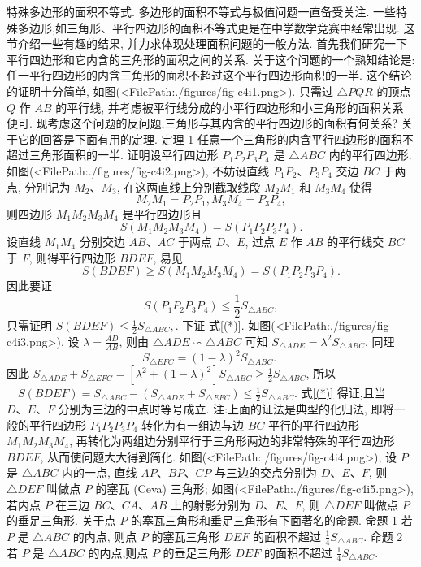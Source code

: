 
特殊多边形的面积不等式.
多边形的面积不等式与极值问题一直备受关注.
一些特殊多边形,如三角形、平行四边形的面积不等式更是在中学数学竞赛中经常出现.
这节介绍一些有趣的结果, 并力求体现处理面积问题的一般方法.
首先我们研究一下平行四边形和它内含的三角形的面积之间的关系.
关于这个问题的一个熟知结论是: 任一平行四边形的内含三角形的面积不超过这个平行四边形面积的一半.
这个结论的证明十分简单, 如图(<FilePath:./figures/fig-c4i1.png>). 只需过 $\triangle P Q R$ 的顶点 $Q$ 作 $A B$ 的平行线, 并考虑被平行线分成的小平行四边形和小三角形的面积关系 便可.
现考虑这个问题的反问题,三角形与其内含的平行四边形的面积有何关系? 关于它的回答是下面有用的定理.
定理 1 任意一个三角形的内含平行四边形的面积不超过三角形面积的一半.
证明设平行四边形 $P_1 P_2 P_3 P_4$ 是 $\triangle A B C$ 内的平行四边形.
如图(<FilePath:./figures/fig-c4i2.png>), 不妨设直线 $P_1 P_2 、 P_3 P_4$ 交边 $B C$ 于两点, 分别记为 $M_2 、 M_3$, 在这两直线上分别截取线段 $M_2 M_1$ 和 $M_3 M_4$ 使得
$$
M_2 M_1=P_2 P_1, M_3 M_4=P_3 P_4,
$$
则四边形 $M_1 M_2 M_3 M_4$ 是平行四边形且
$$
S\left(M_1 M_2 M_3 M_4\right)=S\left(P_1 P_2 P_3 P_4\right) .
$$
设直线 $M_1 M_4$ 分别交边 $A B 、 A C$ 于两点 $D 、 E$, 过点 $E$ 作 $A B$ 的平行线交 $B C$ 于 $F$, 则得平行四边形 $B D E F$, 易见
$$
S(B D E F) \geqslant S\left(M_1 M_2 M_3 M_4\right)=S\left(P_1 P_2 P_3 P_4\right) .
$$
因此要证
$$
S\left(P_1 P_2 P_3 P_4\right) \leqslant \frac{1}{2} S_{\triangle A B C},
$$
只需证明
$S(B D E F) \leqslant \frac{1}{2} S_{\triangle A B C} , \label{(*)}$.
下证 式\ref{(*)}.
如图(<FilePath:./figures/fig-c4i3.png>), 设 $\lambda=\frac{A D}{A B}$, 则由
$\triangle A D E \backsim \triangle A B C$
可知
$S_{\triangle A D E}=\lambda^2 S_{\triangle A B C}$.
同理
$$
S_{\triangle E F C}=(1-\lambda)^2 S_{\triangle A B C} \text {. }
$$
因此 $S_{\triangle A D E}+S_{\triangle E F C}=\left[\lambda^2+(1-\lambda)^2\right] S_{\triangle A B C} \geqslant \frac{1}{2} S_{\triangle A B C}$,
所以 $\quad S(B D E F)=S_{\triangle A B C}-\left(S_{\triangle A D E}+S_{\triangle E F C}\right) \leqslant \frac{1}{2} S_{\triangle A B C}$.
式\ref{(*)} 得证,且当 $D 、 E 、 F$ 分别为三边的中点时等号成立.
注:上面的证法是典型的化归法, 即将一般的平行四边形 $P_1 P_2 P_3 P_4$ 转化为有一组边与边 $B C$ 平行的平行四边形 $M_1 M_2 M_3 M_4$, 再转化为两组边分别平行于三角形两边的非常特殊的平行四边形 $B D E F$, 从而使问题大大得到简化.
如图(<FilePath:./figures/fig-c4i4.png>), 设 $P$ 是 $\triangle A B C$ 内的一点, 直线 $A P 、 B P 、 C P$ 与三边的交点分别为 $D 、 E 、 F$, 则 $\triangle D E F$ 叫做点 $P$ 的塞瓦 (Ceva) 三角形;
如图(<FilePath:./figures/fig-c4i5.png>), 若内点 $P$ 在三边 $B C 、 C A 、 A B$ 上的射影分别为 $D 、 E 、 F$, 则 $\triangle D E F$ 叫做点 $P$ 的垂足三角形.
关于点 $P$ 的塞瓦三角形和垂足三角形有下面著名的命题.
命题 1 若 $P$ 是 $\triangle A B C$ 的内点, 则点 $P$ 的塞瓦三角形 $D E F$ 的面积不超过 $\frac{1}{4} S_{\triangle A B C}$.
命题 2 若 $P$ 是 $\triangle A B C$ 的内点,则点 $P$ 的垂足三角形 $D E F$ 的面积不超过 $\frac{1}{4} S_{\triangle A B C}$.



